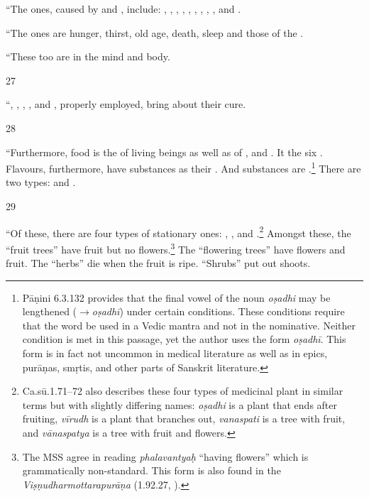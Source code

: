 \begin{translation}
“The  ones, caused by 
     and 
    , 
    include:  
    , 
    , 
    , 
    , 
    , 
    ,
    ,
    ,
    , 
    and
    .
    
“The  ones are hunger, thirst, old age, death, 
    sleep and  those of the .
    
“These too are  in the mind and body.

\item[27]    

“,
    ,
    ,
    ,
     and
    , 
    properly employed, bring about their cure.
    
    
    \item [28] 
    
“Furthermore, food is the   of living beings as well as
of ,  and . It  the six .
Flavours, furthermore, have substances as their
.  And substances are
.\footnote{Pāṇini 6.3.132 provides that the
    final vowel of the noun \emph{oṣadhi} may be lengthened
    (\emph{$\rightarrow$oṣadhī}) under certain conditions.  These
    conditions require that the word be used in a Vedic mantra and not in
    the nominative.  Neither condition is met in this passage, yet the
    author uses the form \emph{oṣadhī}. This form is in fact not uncommon
    in medical literature as well as in epics, purāṇas, smṛtis, and other
    parts of Sanskrit literature.} There are two types:
     and .
    
    
    
    \item [29]  
    
“Of these, there are four types of stationary ones:
, ,
 and
.\footnote{Ca.sū.1.71--72 also describes these
    four types of medicinal plant in similar terms but with slightly
    differing names: \emph{oṣadhi} is a plant that ends after
    fruiting, \emph{vīrudh} is a plant that branches out,
    \emph{vanaspati} is a tree with fruit, and \emph{vānaspatya} is a
    tree with fruit and flowers.} Amongst these, the “fruit trees”
    have fruit but no flowers.\footnote{The MSS agree in reading
        \emph{phalavantyaḥ} “having flowers” which is grammatically
        non-standard. This form is also found in the 
        \emph{Viṣṇudharmottarapurāṇa} (1.92.27,
        \cite[1.92.27][56r]{sarm-1912}).}  The “flowering trees” have
        flowers and fruit.  The “herbs” die when the fruit is ripe.
        “Shrubs” put out shoots.
    

\end{translation}
